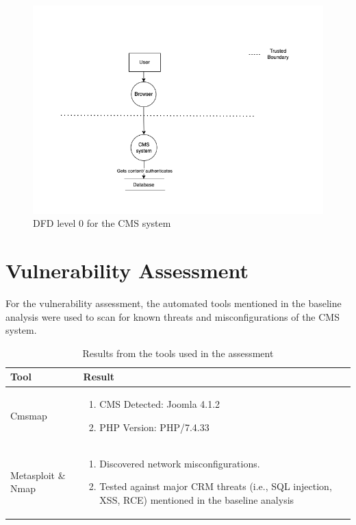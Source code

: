 \begin{figure}[h!]
\centering
\includegraphics[width=\textwidth]{pics/dfd.png}
\caption{DFD level 0 for the CMS system}\label{fig:dfd}
\end{figure}


\section{Vulnerability Assessment}
For the vulnerability assessment, the automated tools mentioned in the baseline analysis were used to scan for known threats and misconfigurations of the CMS system.

\begingroup
\centering
\setlength{\tabcolsep}{6.5pt} %
\renewcommand{\arraystretch}{1.8} %
\begin{longtable}{ |p{7cm}| p{8cm} |}
\caption{Results from the tools used in the assessment}
    \label{table:spoofing}
\hline
\rowcolor{grey!15}
\textbf{Tool}  & \textbf{Result}\\
\hline
Cmsmap &  \begin{enumerate}
    \item CMS Detected: Joomla 4.1.2
    \item PHP Version: PHP/7.4.33
\end{enumerate}\\
\hline
Metasploit \& Nmap &  \begin{enumerate}
    \item Discovered network misconfigurations.
    \item Tested against major CRM threats (i.e., SQL injection, XSS, RCE) mentioned in the baseline analysis 
\end{enumerate}\\
\hline
\end{longtable}
\endgroup
